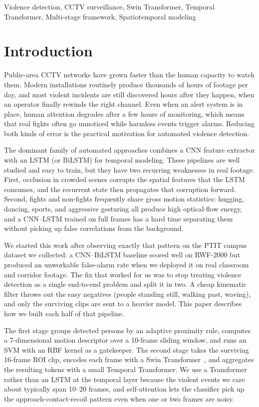 \documentclass[conference]{IEEEtran}
\begin{document}
\begin{IEEEkeywords}
Violence detection, CCTV surveillance, Swin Transformer, Temporal Transformer, Multi-stage framework, Spatiotemporal modeling
\end{IEEEkeywords}

\section{Introduction}
Public-area CCTV networks have grown faster than the human capacity to watch them. Modern installations routinely produce thousands of hours of footage per day, and most violent incidents are still discovered hours after they happen, when an operator finally rewinds the right channel. Even when an alert system is in place, human attention degrades after a few hours of monitoring, which means that real fights often go unnoticed while harmless events trigger alarms. Reducing both kinds of error is the practical motivation for automated violence detection.

The dominant family of automated approaches combines a CNN feature extractor with an LSTM (or BiLSTM) for temporal modeling. These pipelines are well studied and easy to train, but they have two recurring weaknesses in real footage. First, occlusion in crowded scenes corrupts the spatial features that the LSTM consumes, and the recurrent state then propagates that corruption forward. Second, fights and non-fights frequently share gross motion statistics: hugging, dancing, sports, and aggressive gesturing all produce high optical-flow energy, and a CNN--LSTM trained on full frames has a hard time separating them without picking up false correlations from the background.

We started this work after observing exactly that pattern on the PTIT campus dataset we collected: a CNN--BiLSTM baseline scored well on RWF-2000 but produced an unworkable false-alarm rate when we deployed it on real classroom and corridor footage. The fix that worked for us was to stop treating violence detection as a single end-to-end problem and split it in two. A cheap kinematic filter throws out the easy negatives (people standing still, walking past, waving), and only the surviving clips are sent to a heavier model. This paper describes how we built each half of that pipeline.

The first stage groups detected persons by an adaptive proximity rule, computes a 7-dimensional motion descriptor over a 10-frame sliding window, and runs an SVM with an RBF kernel as a gatekeeper. The second stage takes the surviving 16-frame ROI clip, encodes each frame with a Swin Transformer~\cite{9710580}, and aggregates the resulting tokens with a small Temporal Transformer. We use a Transformer rather than an LSTM at the temporal layer because the violent events we care about typically span 10--20 frames, and self-attention lets the classifier pick up the approach-contact-recoil pattern even when one or two frames are noisy.
\end{document}
